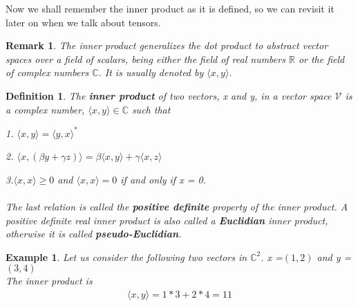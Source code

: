 \documentclass[12pt,a4paper]{article}
\newtheorem{remark}[thm]{Remark}
\newtheorem{defn}[thm]{Definition}
\newtheorem{exmp}{Example}[section]
\begin{document}
Now we shall remember the inner product as it is defined, so we can revisit it later on when we talk about tensors.
\begin{remark}
The inner product generalizes the dot product to abstract vector spaces over a field of scalars, being either the field of real numbers $\mathbb{R}$ or the field of complex numbers $\mathbb{C}$. It is usually denoted by $\langle x, y\rangle$.
\end{remark}
\begin{defn}
The \textbf{inner product} of two vectors, x and y, in a vector space $\mathcal{V}$ is a complex number, $\langle x, y\rangle \in \mathbb{C}$ such that\\
\item \hspace{1cm} 1. $\langle x, y \rangle  = \langle y, x \rangle^*$
\item \hspace{1cm} 2. $\langle x, (\beta y + \gamma z) \rangle = \beta \langle x, y\rangle + \gamma \langle x, z\rangle$
\item \hspace{1cm} 3.$\langle x,x \rangle \geqslant 0 $ and $ \langle x, x \rangle = 0$ if and only if x = 0.\\ \\
The last relation is called the \textbf{positive definite} property of the inner product. A positive definite real inner product is also called a \textbf{Euclidian} inner product, otherwise it is called \textbf{pseudo-Euclidian}.
\end{defn}
\begin{exmp} Let us consider the following two vectors in $\mathbb{C}^2$. x =$(1, 2)$ and y = $(3, 4)$\\
The inner product is
\begin{align*}
 \langle x, y \rangle = 1 * 3 + 2 * 4 = 11
\end{align*}
\end{exmp}
\end{document}
